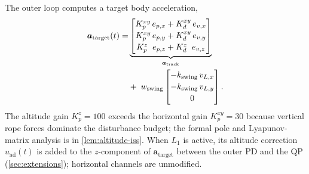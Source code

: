 \documentclass[lettersize,journal]{IEEEtran}
\newcommand{\vect}[1]{\boldsymbol{#1}}
\begin{document}
The outer loop computes a target body acceleration,
\begin{align}
\label{eq:a-target}
  \vect a_{\mathrm{target}}(t)
    =& \underbrace{%
        \begin{bmatrix}
          K_p^{xy}\, e_{p,x} + K_d^{xy}\, e_{v,x} \\[2pt]
          K_p^{xy}\, e_{p,y} + K_d^{xy}\, e_{v,y} \\[2pt]
          K_p^{z}\;\; e_{p,z} + K_d^{z}\;\; e_{v,z}
        \end{bmatrix}}_{\vect a_{\mathrm{track}}}\\
    &+\; w_{\mathrm{swing}}
      \begin{bmatrix}
        -k_{\mathrm{swing}}\, v_{L,x} \\[2pt]
        -k_{\mathrm{swing}}\, v_{L,y} \\[2pt]
        0
      \end{bmatrix}.\nonumber
\end{align}
The altitude gain $K_p^z = 100$ exceeds the horizontal gain $K_p^{xy} = 30$ because vertical rope forces dominate the disturbance budget; the formal pole and Lyapunov-matrix analysis is in \cref{lem:altitude-iss}. When $L_1$ is active, its altitude correction $u_{\mathrm{ad}}(t)$ is added to the $z$-component of $\vect a_{\mathrm{target}}$ between the outer PD and the QP (\cref{sec:extensions}); horizontal channels are unmodified.
\end{document}
